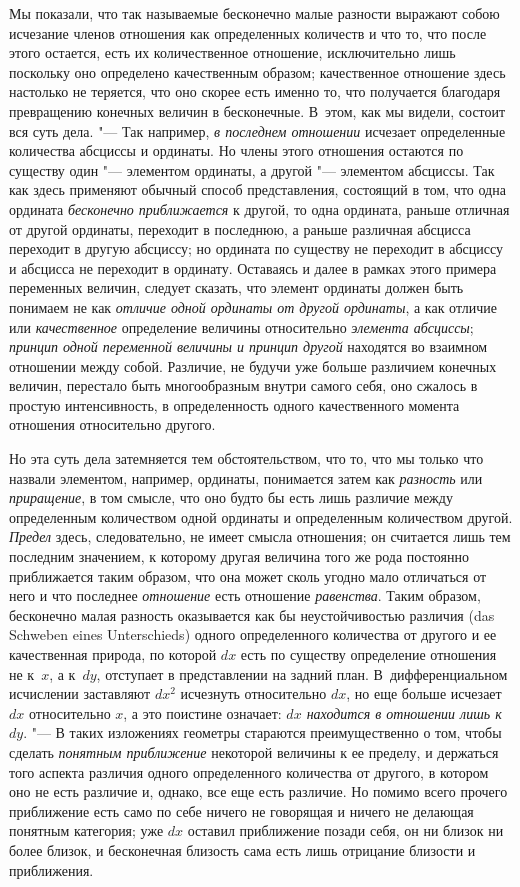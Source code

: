 Мы показали, что так называемые бесконечно малые разности выражают собою
исчезание членов отношения как определенных количеств и что то, что после
этого остается, есть их количественное отношение, исключительно лишь
поскольку оно определено качественным образом; качественное отношение здесь
настолько не теряется, что оно скорее есть именно то, что получается
благодаря превращению конечных величин в бесконечные. В~этом, как мы
видели, состоит вся суть дела. "--- Так например, {\em в
последнем отношении} исчезает определенные количества абсциссы и ординаты.
Но члены этого отношения остаются по существу один "--- элементом ординаты,
а другой "--- элементом абсциссы. Так как здесь применяют обычный способ
представления, состоящий в том, что одна ордината
{\em бесконечно приближается} к другой, то одна
ордината, раньше отличная от другой ординаты, переходит в последнюю, а
раньше различная абсцисса переходит в другую абсциссу; но ордината по
существу не переходит в абсциссу и абсцисса не переходит в ординату.
Оставаясь и далее в рамках этого примера переменных величин, следует
сказать, что элемент ординаты должен быть понимаем не как
{\em отличие одной ординаты от другой ординаты}, а как
отличие или {\em качественное} определение величины
относительно {\em элемента абсциссы};
{\em принцип одной переменной величины и принцип
другой} находятся во взаимном отношении между собой. Различие, не будучи
уже больше различием конечных величин, перестало быть многообразным внутри
самого себя, оно сжалось в простую интенсивность, в определенность одного
качественного момента отношения относительно другого.

Но эта суть дела затемняется тем обстоятельством, что то, что мы только что
назвали элементом, например, ординаты, понимается затем как
{\em разность} или
{\em приращение}, в том смысле, что оно будто бы есть
лишь различие между определенным количеством одной ординаты и определенным
количеством другой. {\em Предел} здесь, следовательно,
не имеет смысла отношения; он считается лишь тем последним значением, к
которому другая величина того же рода постоянно приближается таким образом,
что она может сколь угодно мало отличаться от него и что последнее
{\em отношение} есть отношение
{\em равенства}. Таким образом, бесконечно малая
разность оказывается как бы неустойчивостью различия (das Schweben eines
Unterschieds) одного определенного количества от другого и ее качественная
природа, по которой $dx$ есть по существу определение отношения
не к~$x$, а к~$dy$, отступает в представлении на задний план.
В~дифференциальном исчислении заставляют $dx^2$ исчезнуть относительно
$dx$, но еще больше исчезает $dx$ относительно $x$, а
это поистине означает: {\em $dx$ находится в отношении
лишь к $dy$}. "--- В таких изложениях геометры стараются преимущественно
о том, чтобы сделать {\em понятным приближение} некоторой
величины к ее пределу, и держаться того аспекта различия одного
определенного количества от другого, в котором оно не есть различие и,
однако, все еще есть различие. Но помимо всего прочего приближение есть
само по себе ничего не говорящая и ничего не делающая понятным категория;
уже $dx$ оставил приближение позади себя, он ни
близок ни более близок, и бесконечная близость сама есть лишь отрицание
близости и приближения.

